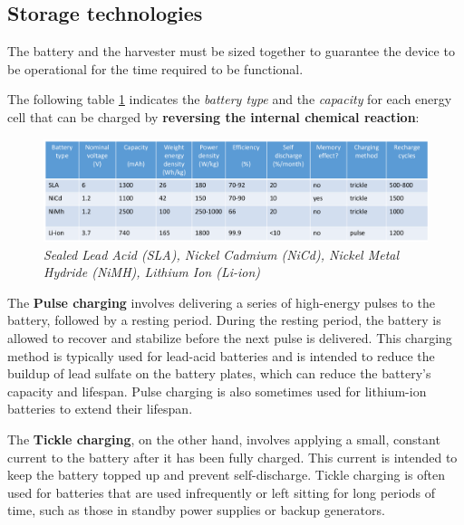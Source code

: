 \documentclass[10pt,a4paper]{report}
\theoremstyle{definition}
\begin{document}
\subsection{Storage technologies}\label{sec:storage-technologies}
The battery and the harvester must be sized together to guarantee the device to be operational for the time required to be functional.

The following table \ref{storage-battery-table} indicates the \textit{battery type} and the \textit{capacity} for each energy cell that can be charged by \textbf{reversing the internal chemical reaction}:
\begin{figure}[h]
	\centering\includegraphics[scale=0.30]{images/Pasted image 20230506084735.png}
	\caption{\textit{Sealed Lead Acid (SLA), Nickel Cadmium (NiCd), Nickel Metal Hydride (NiMH), Lithium Ion (Li-ion)}}
	\label{storage-battery-table}
\end{figure}

The \textbf{Pulse charging} involves delivering a series of high-energy pulses to the battery, followed by a resting period. During the resting period, the battery is allowed to recover and stabilize before the next pulse is delivered. This charging method is typically used for lead-acid batteries and is intended to reduce the buildup of lead sulfate on the battery plates, which can reduce the battery's capacity and lifespan. Pulse charging is also sometimes used for lithium-ion batteries to extend their lifespan.

The \textbf{Tickle charging}, on the other hand, involves applying a small, constant current to the battery after it has been fully charged. This current is intended to keep the battery topped up and prevent self-discharge. Tickle charging is often used for batteries that are used infrequently or left sitting for long periods of time, such as those in standby power supplies or backup generators.
\end{document}
